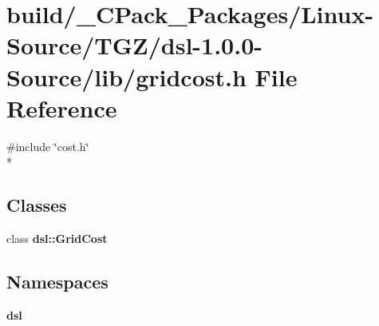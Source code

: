 \section{build/\-\_\-\-C\-Pack\-\_\-\-Packages/\-Linux-\/\-Source/\-T\-G\-Z/dsl-\/1.0.0-\/\-Source/lib/gridcost.h File Reference}
\label{build_2__CPack__Packages_2Linux-Source_2TGZ_2dsl-1_80_80-Source_2lib_2gridcost_8h}
{\ttfamily \#include \char`\"{}cost.\-h\char`\"{}}\\*
\subsection*{Classes}
\begin{DoxyCompactItemize}
\item 
class {\bf dsl\-::\-Grid\-Cost}
\end{DoxyCompactItemize}
\subsection*{Namespaces}
\begin{DoxyCompactItemize}
\item 
{\bf dsl}
\end{DoxyCompactItemize}
